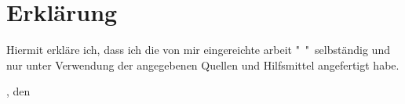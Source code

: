 \setcounter{secnumdepth}{0}
\section{Erklärung}

Hiermit erkläre ich, dass ich die von mir eingereichte \confstudab arbeit "\conftitle\  \conftitletwo "\ selbständig und nur unter Verwendung der angegebenen Quellen und Hilfsmittel angefertigt habe.

\vspace{1.5cm}

\confuort, den \confudate

\vspace{3.5cm}




\confaut